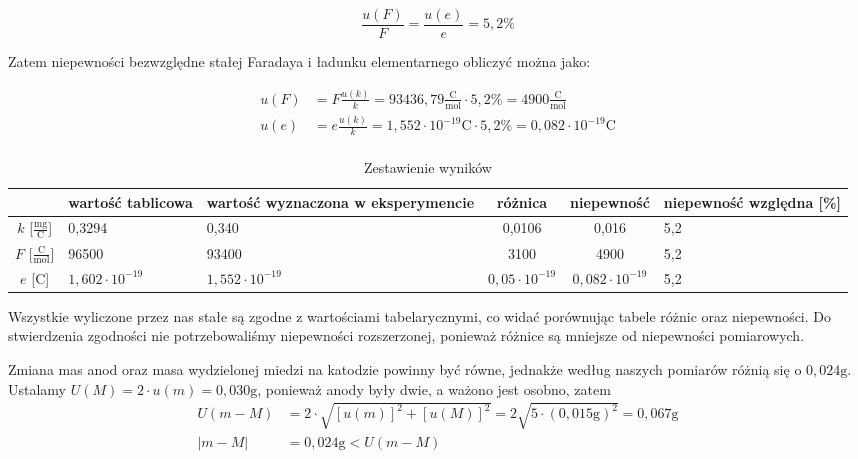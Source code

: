 \documentclass{fizykalab}
\newcommand{\g}{\ensuremath{\text{g}}}
\newcommand{\mgC}{\ensuremath{\frac{\text{mg}}{\text{C}}}}
\begin{document}
\begin{equation*}
    \frac{u(F)}{F} = \frac{u(e)}{e} = 5,2 \%
\end{equation*}

Zatem niepewności bezwzględne stałej Faradaya i
ładunku elementarnego obliczyć można jako:

\begin{align*}
    u(F) &= F \frac{u(k)}{k} = 93436,79  \frac{\text{C}}{\text{mol}} \cdot 5,2 \% = 4900 \frac{\text{C}}{\text{mol}} \\
    u(e) &= e \frac{u(k)}{k} = 1,552 \cdot 10^{-19} \text{C} \cdot 5,2 \% = 0,082 \cdot 10^{-19} \text{C} \\
\end{align*}


\begin{table}[H]
    \centering
    \caption{Zestawienie wyników}
    \begin{tabular}{|c|C{3cm}|C{3cm}|c|c|C{2cm}|}
        \hline
         & wartość tablicowa & wartość wyznaczona w eksperymencie  & różnica  & niepewność  & niepewność względna [\%] \\ \hline
        $k$ [\mgC] & 0,3294 & 0,340 & 0,0106 & 0,016 & 5,2 \\ \hline
        $F$ [$\frac{\text{C}}{\text{mol}}$] & 96500 & 93400 & 3100 & 4900 & 5,2\\ \hline
        $e$ [C] & $1,602 \cdot 10^{-19}$ & $1,552 \cdot 10^{-19}$ & $ 0,05 \cdot 10^{-19}$ & $0,082 \cdot 10^{-19}$ & 5,2 \\ \hline
    \end{tabular}
\end{table}

Wszystkie wyliczone przez nas stałe są zgodne
z wartościami tabelarycznymi, co widać porównując
tabele różnic oraz niepewności. Do stwierdzenia
zgodności nie potrzebowaliśmy niepewności rozszerzonej, 
ponieważ różnice są mniejsze od niepewności pomiarowych.

Zmiana mas anod oraz masa wydzielonej miedzi na katodzie powinny być równe,
jednakże według naszych pomiarów różnią się o $0,024 \g$.
Ustalamy $U(M) = 2 \cdot u(m) = 0,030 \g$, ponieważ 
anody były dwie, a ważono jest osobno, zatem
\begin{align*}
    U(m - M) &= 2 \cdot \sqrt{ \left[ u(m) \right]^2 + \left[ u(M) \right]^2} = 2\sqrt{5\cdot (0,015 \g)^2} = 0,067 \g \\
    |m -M| &= 0,024 \g < U(m - M) 
\end{align*}
\end{document}
